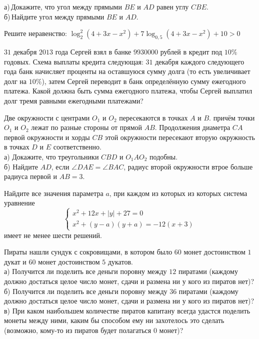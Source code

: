 \begin{training}[2]
\begin{listofex}
		а) Докажите, что угол между прямыми \( BE \) и \( AD \) равен углу \( CBE \).\\		
		б) Найдите угол между прямыми \( BE \) и \( AD \).
		\item Решите неравенство: \( \log^2_2(4+3x-x^2)+7\log_{0,5}(4+3x-x^2)+10>0 \)
		\item \( 31 \) декабря \( 2013 \) года Сергей взял в банке \( 9 930 000 \) рублей в кредит под \( 10\% \) годовых. Схема выплаты кредита следующая: \( 31 \) декабря каждого следующего года банк начисляет проценты на оставшуюся сумму долга (то есть увеличивает долг на \( 10\% \)), затем Сергей переводит в банк определённую сумму ежегодного платежа. Какой должна быть сумма ежегодного платежа, чтобы Сергей выплатил долг тремя равными ежегодными платежами?
		\item Две окружности с центрами \( O_1 \) и \( O_2 \) пересекаются в точках \( A \) и \( B \). причём точки \( O_1 \) и \( O_2 \) лежат по разные стороны от прямой \( AB \). Продолжения диаметра \( CA \) первой окружности и хорды \( CB \) этой окружности пересекают вторую окружность в точках \( D \) и \( E \) соответственно. \\
		а) Докажите, что треугольники \( CBD \) и \( O_1AO_2 \) подобны.\\
		б) Найдите \( AD \), если \( \angle DAE=\angle BAC \), радиус второй окружности втрое больше радиуса первой и \( AB=3 \).
		\item Найдите все значения параметра \( a \), при каждом из которых из которых система уравнение
		\[\begin{cases} x^2+12x+|y|+27=0 \\ x^2+(y-a)(y+a)=-12(x+3) \end{cases}\]
		имеет не менее шести решений.
		\newpage
		\item Пираты нашли сундук с сокровищами, в котором было \( 60 \) монет достоинством \( 1 \) дукат и \( 60  \) монет достоинством \( 5 \) дукатов.\\
		а) Получится ли поделить все деньги поровну между \( 12 \) пиратами (каждому должно достаться целое число монет, сдачи и размена ни у кого из пиратов нет)?\\
		б) Получится ли поделить все деньги поровну между \( 36 \) пиратами (каждому должно достаться целое число монет, сдачи и размена ни у кого из пиратов нет)?\\
		в) При каком наибольшем количестве пиратов капитану всегда удастся поделить монеты между ними, каким бы способом ему ни захотелось это сделать (возможно, кому-то из пиратов будет полагаться \( 0 \) монет)?
	\end{listofex}
\end{training}
